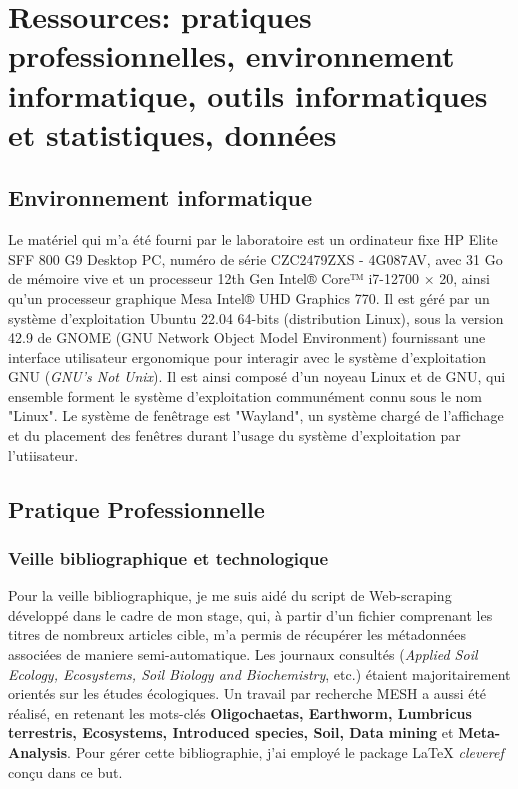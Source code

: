 \documentclass{book}
\begin{document}
\chapter[Ressources]{\label{Second Chapitre}Ressources: pratiques
  professionnelles, environnement informatique, outils informatiques et
  statistiques, données}
\section{Environnement informatique}
\noindent
Le matériel qui m'a été fourni par le laboratoire est un ordinateur fixe HP Elite SFF 800 G9 Desktop PC, numéro de série CZC2479ZXS - 4G087AV, avec 31 Go de mémoire vive et un processeur 12th Gen Intel® Core™ i7-12700 × 20, ainsi qu'un processeur graphique Mesa Intel® UHD Graphics 770. Il est géré par un système d'exploitation Ubuntu 22.04 64-bits (distribution Linux), sous la version 42.9 de GNOME (GNU Network Object Model Environment) fournissant une interface utilisateur ergonomique pour interagir avec le système d'exploitation GNU  (\textit{GNU's Not Unix}). Il est ainsi composé d'un noyeau Linux et de GNU, qui ensemble forment le système d'exploitation communément connu sous le nom "Linux". Le système de fenêtrage est "Wayland", un système chargé de l'affichage et du placement des fenêtres durant l'usage du système d'exploitation par l'utiisateur.

\section{Pratique Professionnelle}

\subsection{Veille bibliographique et technologique}
\noindent
Pour la veille bibliographique, je me suis aidé du script de Web-scraping développé dans le cadre de mon stage, qui, à partir d'un fichier comprenant les titres de nombreux articles cible, m'a permis de récupérer les métadonnées associées de maniere semi-automatique. Les journaux consultés (\textit{Applied Soil Ecology, Ecosystems, Soil Biology and Biochemistry}, etc.) étaient majoritairement orientés sur les études écologiques. Un travail par recherche MESH a aussi été réalisé, en retenant les mots-clés \textbf{Oligochaetas, Earthworm, Lumbricus terrestris, Ecosystems, Introduced species, Soil, Data mining} et \textbf{Meta-Analysis}. Pour gérer cette bibliographie, j'ai employé le package LaTeX \textit{cleveref} conçu dans ce but.
\end{document}
